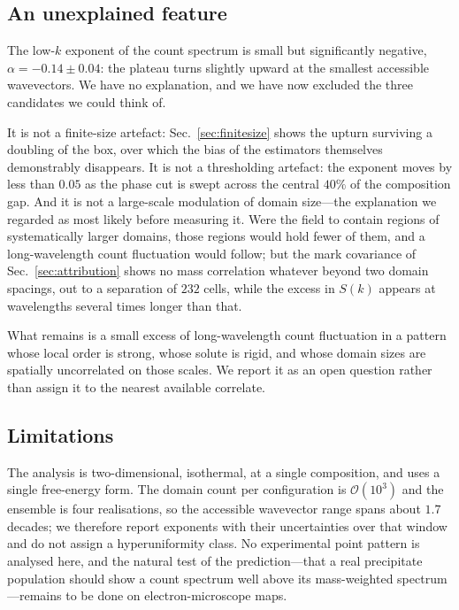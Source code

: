 \documentclass[aps,pre,twocolumn,superscriptaddress,floatfix,longbibliography]{revtex4-2}
\begin{document}
\subsection{An unexplained feature}

The low-$k$ exponent of the count spectrum is small but significantly
negative, $\alpha = -0.14 \pm 0.04$: the plateau turns slightly upward at the
smallest accessible wavevectors. We have no explanation, and we have now
excluded the three candidates we could think of.

It is not a finite-size artefact: Sec.~\ref{sec:finitesize} shows the upturn
surviving a doubling of the box, over which the bias of the estimators
themselves demonstrably disappears. It is not a thresholding artefact: the
exponent moves by less than $0.05$ as the phase cut is swept across the
central $40\%$ of the composition gap. And it is not a large-scale modulation
of domain size---the explanation we regarded as most likely before measuring
it. Were the field to contain regions of systematically larger domains, those
regions would hold fewer of them, and a long-wavelength count fluctuation
would follow; but the mark covariance of Sec.~\ref{sec:attribution} shows no
mass correlation whatever beyond two domain spacings, out to a separation of
$232$ cells, while the excess in $S(k)$ appears at wavelengths several times
longer than that.

What remains is a small excess of long-wavelength count fluctuation in a
pattern whose local order is strong, whose solute is rigid, and whose domain
sizes are spatially uncorrelated on those scales. We report it as an open
question rather than assign it to the nearest available correlate.

\subsection{Limitations}

The analysis is two-dimensional, isothermal, at a single composition, and uses
a single free-energy form. The domain count per configuration is
$\mathcal{O}(10^3)$ and the ensemble is four realisations, so the accessible
wavevector range spans about $1.7$ decades; we therefore report exponents with
their uncertainties over that window and do not assign a hyperuniformity
class. No experimental point pattern is analysed here, and the natural test of
the prediction---that a real precipitate population should show a
count spectrum well above its mass-weighted spectrum---remains to be done on
electron-microscope maps.
\end{document}
